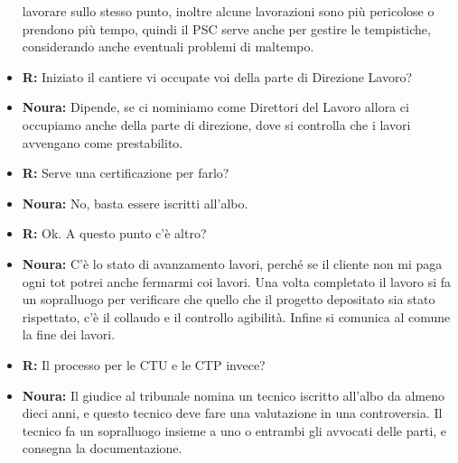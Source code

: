 \documentclass{elegantbook}
\begin{document}
\begin{itemize}
                    lavorare sullo stesso punto, inoltre alcune lavorazioni sono più pericolose o prendono più tempo, quindi il PSC serve anche per gestire le tempistiche, 
                    considerando anche eventuali problemi di maltempo.
		\item \textbf{R:} Iniziato il cantiere vi occupate voi della parte di Direzione Lavoro?
		\item \textbf{Noura:} Dipende, se ci nominiamo come Direttori del Lavoro allora ci occupiamo anche della parte di direzione, dove si controlla che i lavori 
                    avvengano come prestabilito.
		\item \textbf{R:} Serve una certificazione per farlo?
		\item \textbf{Noura:} No, basta essere iscritti all'albo.
		\item \textbf{R:} Ok. A questo punto c'è altro?
		\item \textbf{Noura:} C'è lo stato di avanzamento lavori, perché se il cliente non mi paga ogni tot potrei anche fermarmi coi lavori. Una volta completato 
                    il lavoro si fa un sopralluogo per verificare che quello che il progetto depositato sia stato rispettato, c'è il collaudo e il controllo agibilità. 
                    Infine si comunica al comune la fine dei lavori.
		\item \textbf{R:} Il processo per le CTU e le CTP invece?
		\item \textbf{Noura:} Il giudice al tribunale nomina un tecnico iscritto all'albo da almeno dieci anni, e questo tecnico deve fare una valutazione in una 
                    controversia. Il tecnico fa un sopralluogo insieme a uno o entrambi gli avvocati delle parti, e consegna la documentazione.
	\end{itemize}
	\newpage
\end{document}
